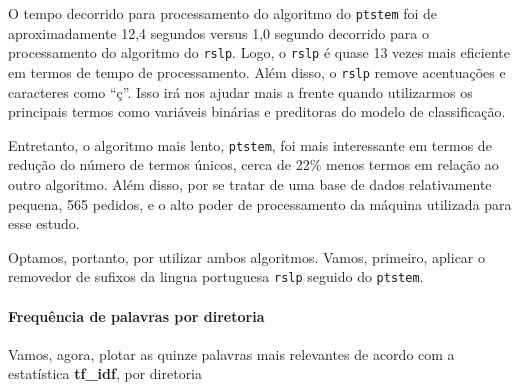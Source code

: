 \documentclass[]{article}
\newenvironment{Shaded}{\begin{snugshade}}{\end{snugshade}}
\newcommand{\KeywordTok}[1]{\textcolor[rgb]{0.13,0.29,0.53}{\textbf{#1}}}
\newcommand{\DataTypeTok}[1]{\textcolor[rgb]{0.13,0.29,0.53}{#1}}
\newcommand{\StringTok}[1]{\textcolor[rgb]{0.31,0.60,0.02}{#1}}
\newcommand{\CommentTok}[1]{\textcolor[rgb]{0.56,0.35,0.01}{\textit{#1}}}
\newcommand{\OtherTok}[1]{\textcolor[rgb]{0.56,0.35,0.01}{#1}}
\newcommand{\OperatorTok}[1]{\textcolor[rgb]{0.81,0.36,0.00}{\textbf{#1}}}
\newcommand{\NormalTok}[1]{#1}
\let\oldparagraph\paragraph
\renewcommand{\paragraph}[1]{\oldparagraph{#1}\mbox{}}
\begin{document}
O tempo decorrido para processamento do algoritmo do \texttt{ptstem} foi
de aproximadamente 12,4 segundos versus 1,0 segundo decorrido para o
processamento do algoritmo do \texttt{rslp}. Logo, o \texttt{rslp} é
quase 13 vezes mais eficiente em termos de tempo de processamento. Além
disso, o \texttt{rslp} remove acentuações e caracteres como ``ç''. Isso
irá nos ajudar mais a frente quando utilizarmos os principais termos
como variáveis binárias e preditoras do modelo de classificação.

Entretanto, o algoritmo mais lento, \texttt{ptstem}, foi mais
interessante em termos de redução do número de termos únicos, cerca de
22\% menos termos em relação ao outro algoritmo. Além disso, por se
tratar de uma base de dados relativamente pequena, 565 pedidos, e o alto
poder de processamento da máquina utilizada para esse estudo.

Optamos, portanto, por utilizar ambos algoritmos. Vamos, primeiro,
aplicar o removedor de sufixos da lingua portuguesa \texttt{rslp}
seguido do \texttt{ptstem}.

\paragraph{Frequência de palavras por
diretoria}\label{frequencia-de-palavras-por-diretoria-3}

\begin{Shaded}
\end{Shaded}

Vamos, agora, plotar as quinze palavras mais relevantes de acordo com a
estatística \textbf{tf\_idf}, por diretoria
\end{document}
